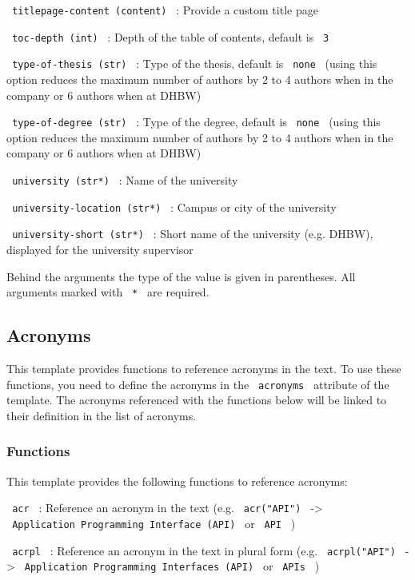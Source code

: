 \texttt{\ titlepage-content\ (content)\ } : Provide a custom title page

\texttt{\ toc-depth\ (int)\ } : Depth of the table of contents, default
is \texttt{\ 3\ }

\texttt{\ type-of-thesis\ (str)\ } : Type of the thesis, default is
\texttt{\ none\ } (using this option reduces the maximum number of
authors by 2 to 4 authors when in the company or 6 authors when at DHBW)

\texttt{\ type-of-degree\ (str)\ } : Type of the degree, default is
\texttt{\ none\ } (using this option reduces the maximum number of
authors by 2 to 4 authors when in the company or 6 authors when at DHBW)

\texttt{\ university\ (str*)\ } : Name of the university

\texttt{\ university-location\ (str*)\ } : Campus or city of the
university

\texttt{\ university-short\ (str*)\ } : Short name of the university
(e.g. DHBW), displayed for the university supervisor

Behind the arguments the type of the value is given in parentheses. All
arguments marked with \texttt{\ *\ } are required.

\subsection{Acronyms}\label{acronyms}

This template provides functions to reference acronyms in the text. To
use these functions, you need to define the acronyms in the
\texttt{\ acronyms\ } attribute of the template. The acronyms referenced
with the functions below will be linked to their definition in the list
of acronyms.

\subsubsection{Functions}\label{functions}

This template provides the following functions to reference acronyms:

\texttt{\ acr\ } : Reference an acronym in the text (e.g.
\texttt{\ acr("API")\ } -\textgreater{}
\texttt{\ Application\ Programming\ Interface\ (API)\ } or
\texttt{\ API\ } )

\texttt{\ acrpl\ } : Reference an acronym in the text in plural form
(e.g. \texttt{\ acrpl("API")\ } -\textgreater{}
\texttt{\ Application\ Programming\ Interfaces\ (API)\ } or
\texttt{\ APIs\ } )

